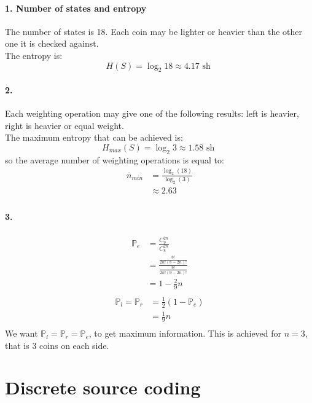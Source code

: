 \documentclass{article}
\newcommand{\1}{\mathbf{1}}
\renewcommand{\P}{\mathbb{P}}
\begin{document}
\paragraph{1. Number of states and entropy}
The number of states is 18. Each coin may be lighter or heavier than the other one it is checked against. \\
The entropy is:
$$
  H(S) = \log_2 18 \approx 4.17 \text{ sh }
$$

\paragraph{2.}
Each weighting operation may give one of the following results: left is heavier, right is heavier or equal weight. \\
The maximum entropy that can be achieved is:
$$
  H_{max}(S) = \log_2 3 \approx 1.58 \text{ sh }
$$
so the average number of weighting operations is equal to:
\begin{align*}
  \bar{n}_{min}
   & = \frac{\log_2(18)}{\log_2(3)} \\
   & \approx 2.63                   \\
\end{align*}

\paragraph{3.}
\begin{align*}
  \P_e
   & = \frac{C^{2n}_9}{C^{2n}_8}                               \\
   & = \frac{\frac{8!}{2n!(8 - 2n)!}}{\frac{9!}{2n!(9 - 2n)!}} \\
   & = 1 - \frac{2}{9}n                                        \\
\end{align*}
\begin{align*}
  \P_l = \P_r
   & = \frac{1}{2} (1 - \P_e) \\
   & = \frac{1}{9}n           \\
\end{align*}
We want $\P_l = \P_r = \P_e$, to get maximum information. This is achieved for $n = 3$, that is 3 coins on each side.

\section{Discrete source coding}
\end{document}

